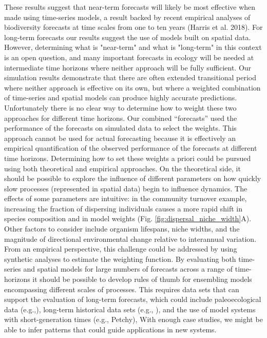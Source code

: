 \documentclass[11pt]{article}
\begin{document}
These results suggest that near-term forecasts will likely be most effective when made using time-series models, a result backed by recent empirical
analyses of biodiversity forecasts at time scales from one to ten years (Harris et al. 2018). For long-term forecasts our results suggest the use
of models built on spatial data. However, determining what is "near-term" and what is "long-term" in this context is an open question, and
many important forecasts in ecology will be needed at intermediate time horizons where neither approach will be
fully sufficient. Our simulation results demonstrate that there are often extended transitional period where neither approach is effective on its own,
but where a weighted combination of time-series and spatial models can produce highly accurate predictions. Unfortunately there is no clear
way to determine how to weight these two approaches for different time horizons. Our combined ``forecasts'' used the performance of
the forecasts on simulated data to select the weights. This approach cannot be used for actual forecasting because it is effectively an empirical
quantification of the observed performance of the forecasts at different time horizons. Determining how to set these
weights a priori could be pursued using both theoretical and empirical approaches. On the theoretical side, it should be possible to explore the influence
of different parameters on how quickly slow processes (represented in spatial data) begin to influence dynamics. The effects of some parameters are intuitive:
in the community turnover example, increasing the fraction of dispersing individuals causes a more rapid shift in species composition and in model weights
(Fig. \ref{fig:dispersal_niche_width}A). Other factors to consider include organism lifespans, niche widths, and the magnitude of directional environmental
change relative to interannual variation. From an empirical perspective, this challenge could be addressed by using synthetic analyses to estimate the
weighting function. By evaluating both time-series and spatial models for large numbers of forecasts across a range of time-horizons it should be possible
to develop rules of thumb for ensembling models encompassing different scales of processes. This requires data sets that can support the evaluation of
long-term forecasts, which could include paleoecological data (e.g.,), long-term historical data sets (e.g., ), and the use of model systems with
short-generation times (e.g., Petchy), With enough case studies, we might be able to infer patterns that could guide applications in new systems.
\end{document}
